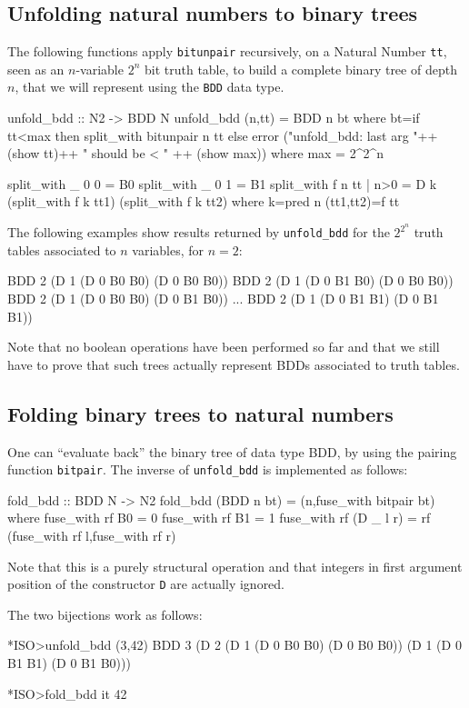 \documentclass[]{INCLUDES/llncs}
\begin{document}
\subsection{Unfolding natural numbers to binary trees}
The following functions apply {\tt bitunpair} recursively, 
on a Natural Number {\tt tt}, 
seen as an $n$-variable $2^n$ bit truth table, 
to build a complete binary tree of depth $n$, 
that we will represent using the {\tt BDD} data type. 
\begin{code}
unfold_bdd :: N2 -> BDD N
unfold_bdd (n,tt) = BDD n bt where 
  bt=if tt<max then split_with bitunpair n tt
     else error 
       ("unfold_bdd: last arg "++ (show tt)++
       " should be < " ++ (show max))
     where max = 2^2^n

split_with _ 0 0 =  B0
split_with _ 0 1 =  B1
split_with f n tt | n>0 = 
   D k (split_with f k tt1) 
       (split_with f k tt2) where
    k=pred n
    (tt1,tt2)=f tt
\end{code}
The following examples 
show results returned by {\tt unfold\_bdd} 
for the $2^{2^n}$ truth tables associated to $n$ variables,
for $n=2$:
\begin{codex}
 BDD 2 (D 1 (D 0 B0 B0) (D 0 B0 B0))
 BDD 2 (D 1 (D 0 B1 B0) (D 0 B0 B0))
 BDD 2 (D 1 (D 0 B0 B0) (D 0 B1 B0))
 ...
 BDD 2 (D 1 (D 0 B1 B1) (D 0 B1 B1))
\end{codex}
Note that no boolean operations have been performed so far
and that we still have to prove that such
trees actually represent BDDs associated to truth tables.

\subsection{Folding binary trees to natural numbers}
One can ``evaluate back'' the binary tree of data type BDD,
by using the pairing function {\tt bitpair}.  
The inverse of {\tt unfold\_bdd} is implemented as follows:
\begin{code}
fold_bdd :: BDD N -> N2
fold_bdd (BDD n bt) = 
  (n,fuse_with bitpair bt) where
    fuse_with rf B0 = 0
    fuse_with rf B1 = 1
    fuse_with rf (D _ l r) = 
      rf (fuse_with rf l,fuse_with rf r)
\end{code}
Note that this is a purely structural operation
and that integers in first argument position
of the constructor {\tt D} are actually ignored.

The two bijections work as follows:
\begin{codex}
*ISO>unfold_bdd (3,42)
  BDD 3 
    (D 2 
      (D 1 (D 0 B0 B0) 
           (D 0 B0 B0)) 
      (D 1 (D 0 B1 B1) 
           (D 0 B1 B0)))

*ISO>fold_bdd it
  42
\end{codex}
\end{document}
